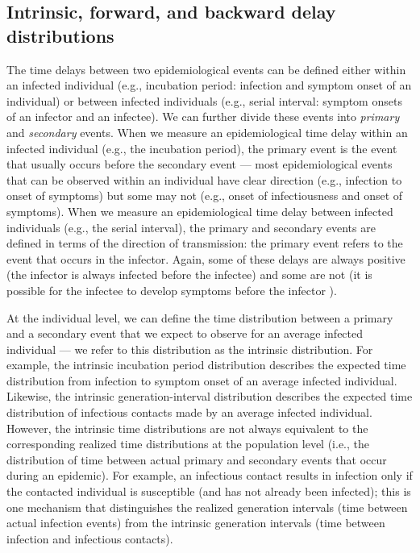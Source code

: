 \documentclass[12pt]{article}
\begin{document}
\subsection{Intrinsic, forward, and backward delay distributions}

The time delays between two epidemiological events can be defined either within an infected individual (e.g., incubation period: infection and symptom onset of an individual) or between infected individuals (e.g., serial interval: symptom onsets of an infector and an infectee).
We can further divide these events into \emph{primary} and \emph{secondary} events.
When we measure an epidemiological time delay within an infected individual (e.g., the incubation period), the primary event is the event that usually occurs before the secondary event ---
most epidemiological events that can be observed within an individual have clear direction (e.g., infection to onset of symptoms) but some may not (e.g., onset of infectiousness and onset of symptoms).
When we measure an epidemiological time delay between infected individuals (e.g., the serial interval), 
the primary and secondary events are defined in terms of the direction of transmission:
the primary event refers to the event that occurs in the infector. 
Again, some of these delays are always positive (the infector is always infected before the infectee) and some are not (it is possible for the infectee to develop symptoms before the infector \citep{he2020temporal}).

At the individual level, we can define the time distribution between a primary and a secondary event that we expect to observe for an average infected individual --- we refer to this distribution as the intrinsic distribution.
For example, the intrinsic incubation period distribution describes the expected time distribution from infection to symptom onset of an average infected individual.
Likewise, the intrinsic generation-interval distribution describes the expected time distribution of infectious contacts made by an average infected individual.
However, the intrinsic time distributions are not always equivalent to the corresponding realized time distributions at the population level (i.e., the distribution of time between actual primary and secondary events that occur during an epidemic).
For example, an infectious contact results in infection only if the contacted individual is susceptible (and has not already been infected);
this is one mechanism that distinguishes the realized generation intervals (time between actual infection events) from the intrinsic generation intervals (time between infection and infectious contacts).
\end{document}
